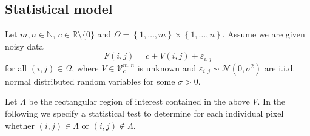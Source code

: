 \documentclass[a4paper,12pt]{article}
\theoremstyle{plain}
\theoremstyle{definition}
\numberwithin{equation}{section}
\begin{document}
\subsection{Statistical model}\label{section: statisticalmodel}

Let $m, n \in \mathbb{N}$, $c \in \mathbb{R} \setminus \{ 0 \}$ and $\Omega = \left\{ 1, \dots, m \right\} \times \left\{ 1, \dots, n \right\}$. Assume we are given noisy data
\begin{equation}\label{statmodel2}
	F(i, j) = c + V(i, j) + \varepsilon_{i, j}
\end{equation}
for all $(i, j) \in \Omega$, where $V \in \mathcal{V}_c^{m, n}$ is unknown and $\varepsilon_{i, j} \sim \mathcal{N}(0, \sigma^2)$ are i.i.d. normal distributed random variables for some $\sigma > 0$.

Let $\varLambda$ be the rectangular region of interest contained in the above $V$. In the following we specify a statistical test to determine for each individual pixel whether $(i, j) \in \varLambda$ or $(i, j) \notin \varLambda$.
\end{document}
